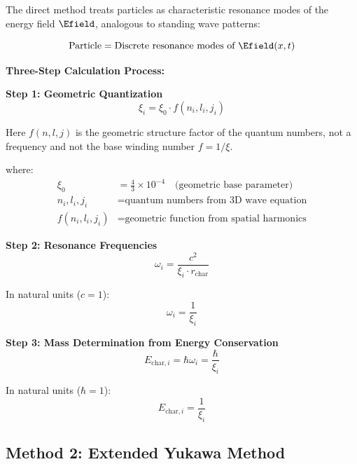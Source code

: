 	The direct method treats particles as characteristic resonance modes of the energy field $\Efield$, analogous to standing wave patterns:
	
	\begin{equation}
		\text{Particle} = \text{Discrete resonance modes of } \Efield(x,t)
	\end{equation}
	
	\textbf{Three-Step Calculation Process:}
	
	\textbf{Step 1: Geometric Quantization}
	\begin{equation}
		\xi_i = \xi_0 \cdot f(n_i, l_i, j_i)
		\label{eq:geometric_quantization}
	\end{equation}

Here $f(n,l,j)$ is the geometric structure factor of the quantum numbers, not a frequency and not the base winding number $f = 1/\xi$.

	where:
	\begin{align}
		\xi_0 &= \frac{4}{3} \times 10^{-4} \quad \text{(geometric base parameter)} \\
		n_i, l_i, j_i &= \text{quantum numbers from 3D wave equation} \\
		f(n_i, l_i, j_i) &= \text{geometric function from spatial harmonics}
	\end{align}
	
	\textbf{Step 2: Resonance Frequencies}
	\begin{equation}
		\omega_i = \frac{c^2}{\xi_i \cdot r_{\text{char}}}
		\label{eq:resonance_frequencies}
	\end{equation}
	
	In natural units ($c = 1$):
	\begin{equation}
		\omega_i = \frac{1}{\xi_i}
	\end{equation}
	
	\textbf{Step 3: Mass Determination from Energy Conservation}
	\begin{equation}
		E_{\text{char},i} = \hbar \omega_i = \frac{\hbar}{\xi_i}
		\label{eq:energy_from_frequency}
	\end{equation}
	
	In natural units ($\hbar = 1$):
	\begin{equation}
		\boxed{E_{\text{char},i} = \frac{1}{\xi_i}}
		\label{eq:characteristic_energy_direct}
	\end{equation}
	
	\subsection{Method 2: Extended Yukawa Method}
	\label{subsec:extended_yukawa_method}
	
